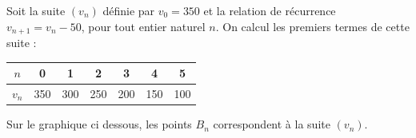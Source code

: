 \documentclass[10pt,a4paper,openany,twoside]{book}
\begin{document}
\begin{ex}{}{}

\noindent \begin{minipage}{10cm}
Soit la suite $(v_n)$ définie par $v_0=350$ et la relation de récurrence $v_{n+1}=v_n -50$, pour tout entier naturel $n$.
On calcul les premiers termes de cette suite :
\begin{center}
\renewcommand{\arraystretch}{1.3}
\begin{tabular}{|c|c|c|c|c|c|c|}
\hline
$n$ & 0 & 1 & 2 & 3 & 4 & 5 \\
\hline
$v_n $ & 350 & 300 & 250 & 200 & 150 & 100 \\
\hline
\end{tabular}
\end{center}
\noindent Sur le graphique ci dessous, les points $B_n$ correspondent à la suite $(v_n)$.


\end{minipage}
\end{ex}
\end{document}
